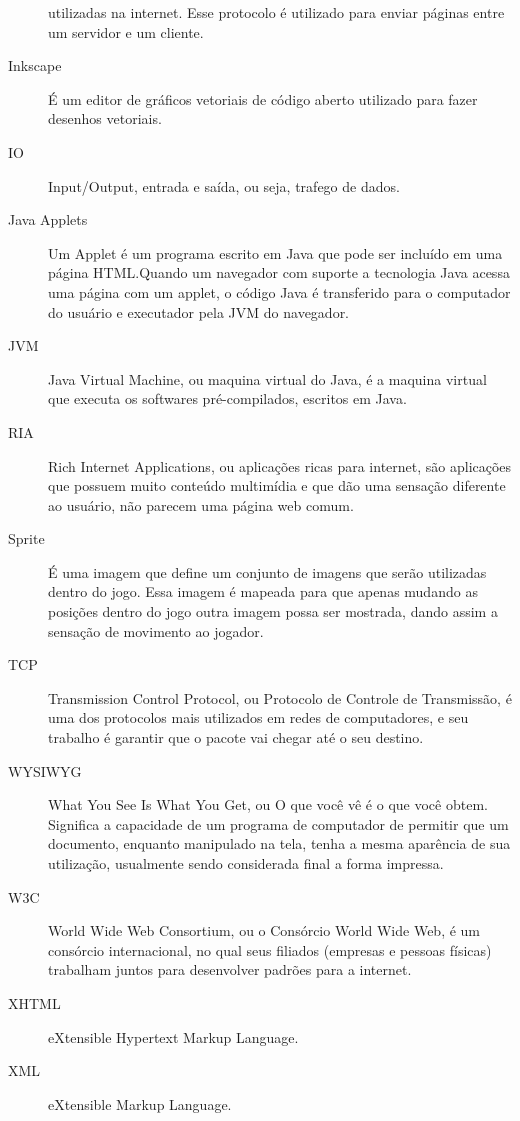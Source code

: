 \begin{description}
utilizadas na internet. Esse protocolo é utilizado para enviar páginas
entre um servidor e um cliente.
\item[Inkscape ] É um editor de gráficos vetoriais de código aberto
utilizado para fazer desenhos vetoriais.
\item[IO ] Input/Output, entrada e saída, ou seja, trafego de dados.
\item[Java Applets ] Um Applet é um programa escrito em Java que pode
ser incluído em uma página HTML.Quando um navegador com suporte a
tecnologia Java acessa uma página com um applet, o código Java é
transferido para o computador do usuário e executador pela JVM do
navegador.
\item[JVM ] Java Virtual Machine, ou maquina virtual do Java, é a
maquina virtual que executa os softwares pré-compilados, escritos em
Java.
\item[RIA ] Rich Internet Applications, ou aplicações ricas para
internet, são aplicações que possuem muito conteúdo multimídia e que
dão uma sensação diferente ao usuário, não parecem uma página web
comum.
\item[Sprite ] É uma imagem que define um conjunto de imagens que
serão utilizadas dentro do jogo. Essa imagem é mapeada para que apenas
mudando as posições dentro do jogo outra imagem possa ser mostrada,
dando assim a sensação de movimento ao jogador.
\item[TCP ] Transmission Control Protocol, ou Protocolo de Controle de
Transmissão, é uma dos protocolos mais utilizados em redes de
computadores, e seu trabalho é garantir que o pacote vai chegar até o
seu destino.
\item[WYSIWYG ] What You See Is What You Get, ou O que você vê é o que
você obtem. Significa a capacidade de um programa de computador de
permitir que um documento, enquanto manipulado na tela, tenha a mesma
aparência de sua utilização, usualmente sendo considerada final a
forma impressa.
\item[W3C ] World Wide Web Consortium, ou o Consórcio World Wide Web,
é um consórcio internacional, no qual seus filiados (empresas e
pessoas físicas) trabalham juntos para desenvolver padrões para a
internet.
\item[XHTML ] eXtensible Hypertext Markup Language.
\item[XML ] eXtensible Markup Language.

\end{description}
\newpage
